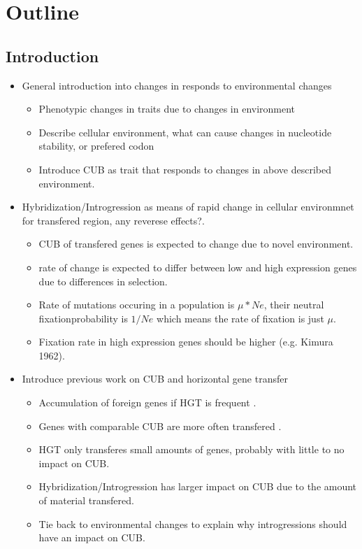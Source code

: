 \documentclass[12pt]{article}
\begin{document}
\section*{Outline}
\subsection{Introduction}
\begin{itemize}
	\item General introduction into changes in responds to environmental changes
	\begin{itemize}
		\item Phenotypic changes in traits due to changes in environment
		\item Describe cellular environment, what can cause changes in nucleotide stability, or prefered codon
		\item Introduce CUB as trait that responds to changes in above described environment.
	\end{itemize}
	\item Hybridization/Introgression as means of rapid change in cellular environmnet for transfered region, any reverese effects?.
	\begin{itemize}
		\item CUB of transfered genes is expected to change due to novel environment.
		\item rate of change is expected to differ between low and high expression genes due to differences in selection.
		\item Rate of mutations occuring in a population is $\mu*Ne$, their neutral fixationprobability is $1/Ne$ which means the rate of fixation is just $\mu$. 
		\item Fixation rate in high expression genes should be higher (e.g. Kimura 1962).
	\end{itemize}
	\item Introduce previous work on CUB and horizontal gene transfer
	\begin{itemize}
		\item Accumulation of foreign genes if HGT is frequent \citep{lawrence1997}.
		\item Genes with comparable CUB are more often transfered \citep{tuller2011}.
		\item HGT only transferes small amounts of genes, probably with little to no impact on CUB.
		\item Hybridization/Introgression has larger impact on CUB due to the amount of material transfered.
		\item Tie back to environmental changes to explain why introgressions should have an impact on CUB.

\end{itemize}
\end{itemize}
\end{document}

